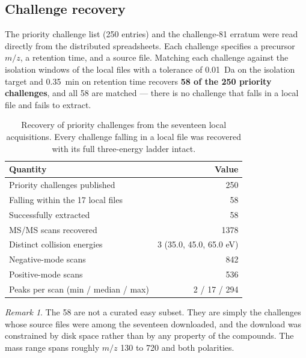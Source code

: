 \documentclass[11pt,twocolumn,a4paper]{article}
\theoremstyle{definition}
\theoremstyle{remark}
\newtheorem{remark}[theorem]{Remark}
\begin{document}
\subsection{Challenge recovery}

The priority challenge list (250 entries) and the challenge-81 erratum were read
directly from the distributed spreadsheets. Each challenge specifies a precursor
$m/z$, a retention time, and a source file. Matching each challenge against the
isolation windows of the local files with a tolerance of 0.01~Da on the isolation
target and 0.35~min on retention time recovers \textbf{58 of the 250 priority
challenges}, and all 58 are matched --- there is no challenge that falls in a
local file and fails to extract.

\begin{table}[!htbp]
\centering
\caption{Recovery of priority challenges from the seventeen local acquisitions.
Every challenge falling in a local file was recovered with its full
three-energy ladder intact.}
\label{tab:recovery}
\begin{tabular}{lr}
\toprule
Quantity & Value \\
\midrule
Priority challenges published            & 250 \\
Falling within the 17 local files        & 58 \\
Successfully extracted                   & 58 \\
MS/MS scans recovered                    & 1378 \\
Distinct collision energies              & 3 (35.0, 45.0, 65.0 eV) \\
Negative-mode scans                      & 842 \\
Positive-mode scans                      & 536 \\
Peaks per scan (min / median / max)       & 2 / 17 / 294 \\
\bottomrule
\end{tabular}
\end{table}

\begin{remark}
The 58 are not a curated easy subset. They are simply the challenges whose source
files were among the seventeen downloaded, and the download was constrained by
disk space rather than by any property of the compounds. The mass range spans
roughly $m/z$ 130 to 720 and both polarities.
\end{remark}

\end{document}
